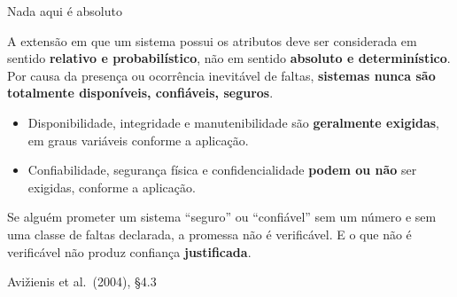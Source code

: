 \documentclass{beamer}
\newcommand{\sect}[1]{\par\smallskip\hfill{\tiny\color{black!55}Avi\v{z}ienis et al.\ (2004), #1}}
\begin{document}
\begin{frame}{Nada aqui \'e absoluto}
    \footnotesize
    \begin{defi}
        \scriptsize
        A extens\~ao em que um sistema possui os atributos deve ser considerada em sentido \textbf{relativo e probabil\'istico}, n\~ao em sentido \textbf{absoluto e determin\'istico}. Por causa da presen\c{c}a ou ocorr\^encia inevit\'avel de faltas, \textbf{sistemas nunca s\~ao totalmente dispon\'iveis, confi\'aveis, seguros}.
    \end{defi}
    \medskip
    \begin{itemize}
        \item Disponibilidade, integridade e manutenibilidade s\~ao \textbf{geralmente exigidas}, em graus vari\'aveis conforme a aplica\c{c}\~ao.
        \item Confiabilidade, seguran\c{c}a f\'isica e confidencialidade \textbf{podem ou n\~ao} ser exigidas, conforme a aplica\c{c}\~ao.
    \end{itemize}
    \medskip
    \begin{ancora}
        \footnotesize
        Se algu\'em prometer um sistema ``seguro'' ou ``confi\'avel'' sem um n\'umero e sem uma classe de faltas declarada, a promessa n\~ao \'e verific\'avel. E o que n\~ao \'e verific\'avel n\~ao produz confian\c{c}a \textbf{justificada}.
    \end{ancora}
    \sect{\S4.3}
\end{frame}
\end{document}
